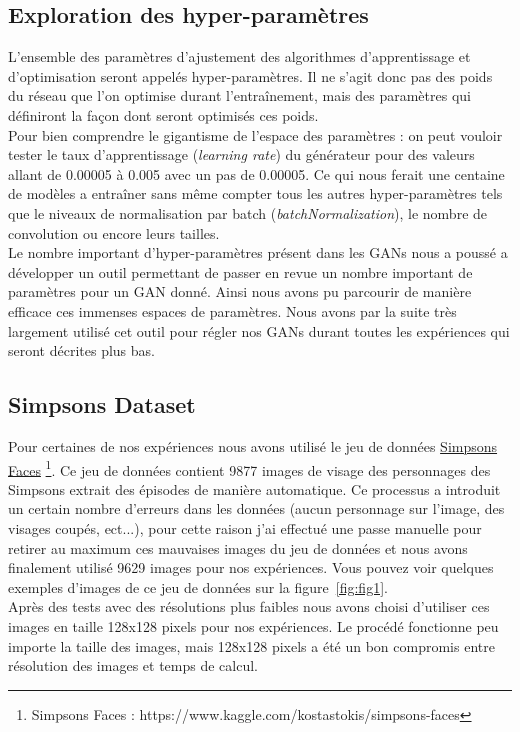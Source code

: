 \documentclass[11pt,francais]{article}
\begin{document}
\subsection{Exploration des hyper-paramètres}
\label{sec:ParamsScans}
L'ensemble des paramètres d'ajustement des algorithmes d'apprentissage et d'optimisation seront appelés hyper-paramètres. Il ne s'agit donc pas des poids du réseau que l'on optimise durant l'entraînement, mais des paramètres qui définiront la façon dont seront optimisés ces poids.\\
Pour bien comprendre le gigantisme de l'espace des paramètres : on peut vouloir tester le taux d'apprentissage (\textit{learning rate}) du générateur pour des valeurs allant de 0.00005 à 0.005 avec un pas de 0.00005. Ce qui nous ferait une centaine de modèles a entraîner sans même compter tous les autres hyper-paramètres tels que le niveaux de normalisation par batch (\textit{batchNormalization}), le nombre de convolution ou encore leurs tailles.\\
Le nombre important d'hyper-paramètres présent dans les GANs nous a poussé a développer un outil permettant de passer en revue un nombre important de paramètres pour un GAN donné.
Ainsi nous avons pu parcourir de manière efficace ces immenses espaces de paramètres. Nous avons par la suite très largement utilisé cet outil pour régler nos GANs durant toutes les expériences qui seront décrites plus bas.

\subsection{Simpsons Dataset}
\label{sec:SimpsonsDataset}
Pour certaines de nos expériences nous avons utilisé le jeu de données \href{https://www.kaggle.com/kostastokis/simpsons-faces}{Simpsons Faces} \footnote{\label{note2}Simpsons Faces : https://www.kaggle.com/kostastokis/simpsons-faces}. Ce jeu de données contient 9877 images de visage des personnages des Simpsons extrait des épisodes de manière automatique. Ce processus a introduit un certain nombre d'erreurs dans les données (aucun personnage sur l'image, des visages coupés, ect...), pour cette raison j'ai effectué une passe manuelle pour retirer au maximum ces mauvaises images du jeu de données et nous avons finalement utilisé 9629 images pour nos expériences. Vous pouvez voir quelques exemples d'images de ce jeu de données sur la figure~\ref{fig:fig1}.\\
Après des tests avec des résolutions plus faibles nous avons choisi d'utiliser ces images en taille 128x128 pixels pour nos expériences. Le procédé fonctionne peu importe la taille des images, mais 128x128 pixels a été un bon compromis entre résolution des images et temps de calcul.
\end{document}
